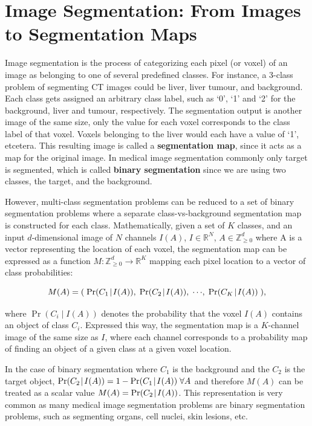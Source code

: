 \section{Image Segmentation: From Images to Segmentation Maps}

Image segmentation is the process of categorizing each pixel (or voxel) of an image as belonging to one of several predefined classes. For instance, a 3-class problem of segmenting CT images could be liver, liver tumour, and background. Each class gets assigned an arbitrary class label, such as `0', `1' and `2' for the background, liver and tumour, respectively. The segmentation output is another image of the same size, only the value for each voxel corresponds to the class label of that voxel. Voxels belonging to the liver would each have a value of `1', etcetera. This resulting image is called a \textbf{segmentation map}, since it acts as a map for the original image. In medical image segmentation commonly only target is segmented, which is called \textbf{binary segmentation} since we are using two classes, the target, and the background.

However, multi-class segmentation problems can be reduced to a set of binary segmentation problems where a separate class-vs-background segmentation map is constructed for each class. Mathematically, given a set of $K$ classes, and an input $d$-dimensional image of $N$ channels $I(A)$, $I \in \mathbb{R}^{N}$, $A \in \mathbb{Z}_{\geq0}^d$ where A is a vector representing the location of each voxel, the segmentation map can be expressed as a function $M : \mathbb{Z}_{\geq0}^d \rightarrow \mathbb{R}^K$ mapping each pixel location to a vector of class probabilities:

\begin{equation}
M(A) = (\;\operatorname{Pr}({C_1}\!\mid\!{I(A)}),\; \operatorname{Pr}({C_2}\!\mid\!{I(A)}),\; \cdots\!,\;  \operatorname{Pr}({C_{K}}\!\mid\!{I(A)})\;),
\end{equation}

where $\operatorname{Pr} (C_i \!\mid\! I(A))$ denotes the probability that the voxel $I(A)$ contains an object of class $C_i$. Expressed this way, the segmentation map is a $K$-channel image of the same size as $I$, where each channel corresponds to a probability map of finding an object of a given class at a given voxel location. 

In the case of binary segmentation where $C_1$ is the background and the $C_2$ is the target object, $\operatorname{Pr}({C_2}\!\mid\!{I(A)}) = 1 - \operatorname{Pr}({C_1}\!\mid\!{I(A)})\; \forall A$ and therefore $M(A)$ can be treated as a scalar value $M(A) = \operatorname{Pr}({C_2}\!\mid\!{I(A)})$. This representation is very common as many medical image segmentation problems are binary segmentation problems, such as segmenting organs, cell nuclei, skin lesions, etc.

